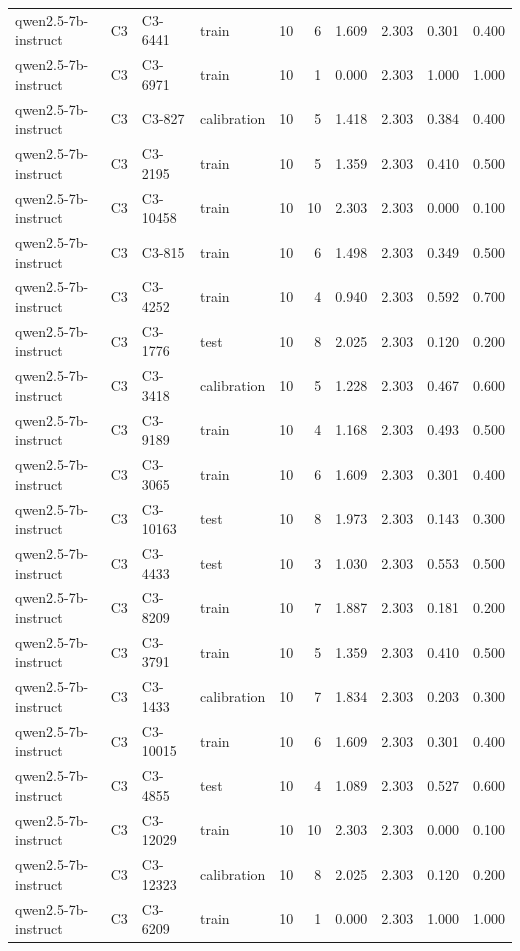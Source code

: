 \begin{table}
\begin{tabular}{llllrrrrrr}
qwen2.5-7b-instruct & C3 & C3-6441 & train & 10 & 6 & 1.609 & 2.303 & 0.301 & 0.400 \\
qwen2.5-7b-instruct & C3 & C3-6971 & train & 10 & 1 & 0.000 & 2.303 & 1.000 & 1.000 \\
qwen2.5-7b-instruct & C3 & C3-827 & calibration & 10 & 5 & 1.418 & 2.303 & 0.384 & 0.400 \\
qwen2.5-7b-instruct & C3 & C3-2195 & train & 10 & 5 & 1.359 & 2.303 & 0.410 & 0.500 \\
qwen2.5-7b-instruct & C3 & C3-10458 & train & 10 & 10 & 2.303 & 2.303 & 0.000 & 0.100 \\
qwen2.5-7b-instruct & C3 & C3-815 & train & 10 & 6 & 1.498 & 2.303 & 0.349 & 0.500 \\
qwen2.5-7b-instruct & C3 & C3-4252 & train & 10 & 4 & 0.940 & 2.303 & 0.592 & 0.700 \\
qwen2.5-7b-instruct & C3 & C3-1776 & test & 10 & 8 & 2.025 & 2.303 & 0.120 & 0.200 \\
qwen2.5-7b-instruct & C3 & C3-3418 & calibration & 10 & 5 & 1.228 & 2.303 & 0.467 & 0.600 \\
qwen2.5-7b-instruct & C3 & C3-9189 & train & 10 & 4 & 1.168 & 2.303 & 0.493 & 0.500 \\
qwen2.5-7b-instruct & C3 & C3-3065 & train & 10 & 6 & 1.609 & 2.303 & 0.301 & 0.400 \\
qwen2.5-7b-instruct & C3 & C3-10163 & test & 10 & 8 & 1.973 & 2.303 & 0.143 & 0.300 \\
qwen2.5-7b-instruct & C3 & C3-4433 & test & 10 & 3 & 1.030 & 2.303 & 0.553 & 0.500 \\
qwen2.5-7b-instruct & C3 & C3-8209 & train & 10 & 7 & 1.887 & 2.303 & 0.181 & 0.200 \\
qwen2.5-7b-instruct & C3 & C3-3791 & train & 10 & 5 & 1.359 & 2.303 & 0.410 & 0.500 \\
qwen2.5-7b-instruct & C3 & C3-1433 & calibration & 10 & 7 & 1.834 & 2.303 & 0.203 & 0.300 \\
qwen2.5-7b-instruct & C3 & C3-10015 & train & 10 & 6 & 1.609 & 2.303 & 0.301 & 0.400 \\
qwen2.5-7b-instruct & C3 & C3-4855 & test & 10 & 4 & 1.089 & 2.303 & 0.527 & 0.600 \\
qwen2.5-7b-instruct & C3 & C3-12029 & train & 10 & 10 & 2.303 & 2.303 & 0.000 & 0.100 \\
qwen2.5-7b-instruct & C3 & C3-12323 & calibration & 10 & 8 & 2.025 & 2.303 & 0.120 & 0.200 \\
qwen2.5-7b-instruct & C3 & C3-6209 & train & 10 & 1 & 0.000 & 2.303 & 1.000 & 1.000 \\

\end{tabular}
\end{table}
